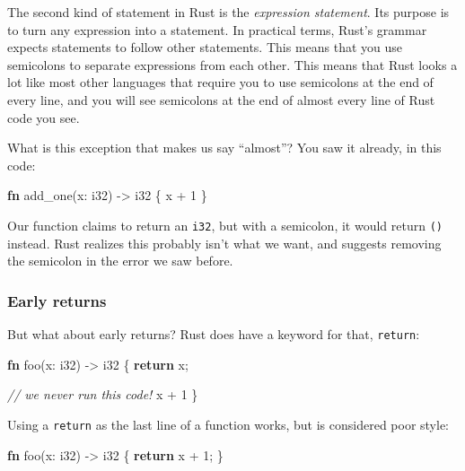 \documentclass[a4paper,]{book}
\newenvironment{Shaded}{\begin{snugshade}}{\end{snugshade}}
\newcommand{\KeywordTok}[1]{\textcolor[rgb]{0.13,0.29,0.53}{\textbf{{#1}}}}
\newcommand{\DataTypeTok}[1]{\textcolor[rgb]{0.13,0.29,0.53}{{#1}}}
\newcommand{\DecValTok}[1]{\textcolor[rgb]{0.00,0.00,0.81}{{#1}}}
\newcommand{\CommentTok}[1]{\textcolor[rgb]{0.56,0.35,0.01}{\textit{{#1}}}}
\newcommand{\NormalTok}[1]{{#1}}
\begin{document}
The second kind of statement in Rust is the \emph{expression statement}.
Its purpose is to turn any expression into a statement. In practical
terms, Rust's grammar expects statements to follow other statements.
This means that you use semicolons to separate expressions from each
other. This means that Rust looks a lot like most other languages that
require you to use semicolons at the end of every line, and you will see
semicolons at the end of almost every line of Rust code you see.

What is this exception that makes us say ``almost''? You saw it already,
in this code:

\begin{Shaded}
\begin{Highlighting}[]
\KeywordTok{fn} \NormalTok{add_one(x: }\DataTypeTok{i32}\NormalTok{) -> }\DataTypeTok{i32} \NormalTok{\{}
    \NormalTok{x + }\DecValTok{1}
\NormalTok{\}}
\end{Highlighting}
\end{Shaded}

Our function claims to return an \texttt{i32}, but with a semicolon, it
would return \texttt{()} instead. Rust realizes this probably isn't what
we want, and suggests removing the semicolon in the error we saw before.

\subsubsection{Early returns}\label{early-returns-1}

But what about early returns? Rust does have a keyword for that,
\texttt{return}:

\begin{Shaded}
\begin{Highlighting}[]
\KeywordTok{fn} \NormalTok{foo(x: }\DataTypeTok{i32}\NormalTok{) -> }\DataTypeTok{i32} \NormalTok{\{}
    \KeywordTok{return} \NormalTok{x;}

    \CommentTok{// we never run this code!}
    \NormalTok{x + }\DecValTok{1}
\NormalTok{\}}
\end{Highlighting}
\end{Shaded}

Using a \texttt{return} as the last line of a function works, but is
considered poor style:

\begin{Shaded}
\begin{Highlighting}[]
\KeywordTok{fn} \NormalTok{foo(x: }\DataTypeTok{i32}\NormalTok{) -> }\DataTypeTok{i32} \NormalTok{\{}
    \KeywordTok{return} \NormalTok{x + }\DecValTok{1}\NormalTok{;}
\NormalTok{\}}
\end{Highlighting}
\end{Shaded}
\end{document}
